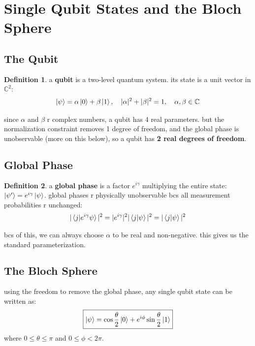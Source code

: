 \documentclass[11pt,a4paper]{article}
\theoremstyle{definition}
\newtheorem{definition}{Definition}[section]
\theoremstyle{remark}
\begin{document}
\section{Single Qubit States and the Bloch Sphere}

\subsection{The Qubit}

\begin{definition}
a \textbf{qubit} is a two-level quantum system. its state is a unit vector in $\mathbb{C}^2$:
\[
\ket{\psi} = \alpha\ket{0} + \beta\ket{1}, \quad |\alpha|^2 + |\beta|^2 = 1, \quad \alpha, \beta \in \mathbb{C}
\]
\end{definition}

since $\alpha$ and $\beta$ r complex numbers, a qubit has 4 real parameters. but the normalization constraint removes 1 degree of freedom, and the global phase is unobservable (more on this below), so a qubit has \textbf{2 real degrees of freedom}.

\subsection{Global Phase}

\begin{definition}
a \textbf{global phase} is a factor $e^{i\gamma}$ multiplying the entire state: $\ket{\psi'} = e^{i\gamma}\ket{\psi}$. global phases r physically unobservable bcs all measurement probabilities r unchanged:
\[
|\braket{j|e^{i\gamma}\psi}|^2 = |e^{i\gamma}|^2 |\braket{j|\psi}|^2 = |\braket{j|\psi}|^2
\]
\end{definition}

bcs of this, we can always choose $\alpha$ to be real and non-negative. this gives us the standard parameterization.

\subsection{The Bloch Sphere}

using the freedom to remove the global phase, any single qubit state can be written as:
\[
\boxed{\ket{\psi} = \cos\frac{\theta}{2}\ket{0} + e^{i\phi}\sin\frac{\theta}{2}\ket{1}}
\]
where $0 \leq \theta \leq \pi$ and $0 \leq \phi < 2\pi$.
\end{document}
